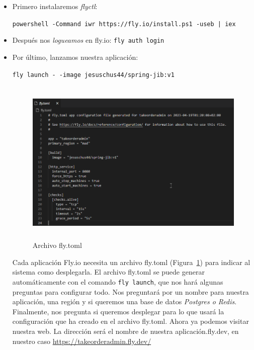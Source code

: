 \begin{itemize}
\item Primero instalaremos \textit{flyctl}: 
\begin{center}
    \texttt{powershell -Command iwr https://fly.io/install.ps1 -useb | iex}
\end{center}

\item Después nos \textit{logueamos} en fly.io: \texttt{fly auth login}
\item Por último, lanzamos nuestra aplicación: 

\begin{center}
    \texttt{fly launch - -image jesuschus44/spring-jib:v1} 

\end{center}

\begin{figure}[h]
    \centering
    \includegraphics[width=14cm, height=8cm]{Imagenes/Figuras/fly.toml.png} 
   \caption{Archivo fly.toml\label{fig:flytoml}}
\end{figure}

Cada aplicación Fly.io necesita un archivo fly.toml (Figura~\ref{fig:flytoml}) para indicar al sistema como desplegarla. El archivo fly.toml se puede generar automáticamente con el comando \texttt{fly launch}, que nos hará algunas preguntas para configurar todo.
Nos preguntará por un nombre para nuestra aplicación, una región y si queremos una base de datos \textit{Postgres o Redis}. Finalmente, nos pregunta si queremos desplegar para lo que usará la configuración que ha creado en el archivo fly.toml.
Ahora ya podemos visitar nuestra web. La dirección será el nombre de nuestra aplicación.fly.dev, en nuestro caso \url{https://takeorderadmin.fly.dev/}
\end{itemize}



